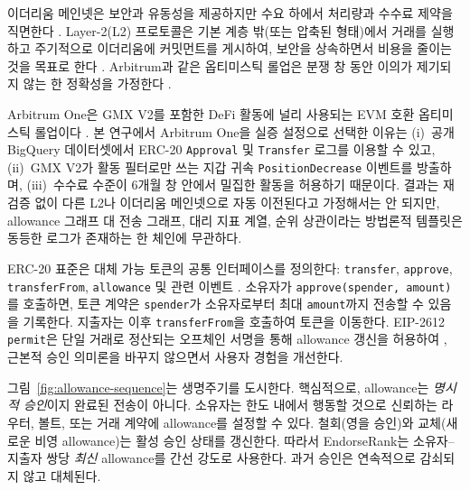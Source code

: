 
이더리움 메인넷은 보안과 유동성을 제공하지만 수요 하에서 처리량과 수수료 제약을 직면한다 . Layer-2(L2) 프로토콜은 기본 계층 밖(또는 압축된 형태)에서 거래를 실행하고 주기적으로 이더리움에 커밋먼트를 게시하여, 보안을 상속하면서 비용을 줄이는 것을 목표로 한다 . Arbitrum과 같은 옵티미스틱 롤업은 분쟁 창 동안 이의가 제기되지 않는 한 정확성을 가정한다 .

Arbitrum One은 GMX V2를 포함한 DeFi 활동에 널리 사용되는 EVM 호환 옵티미스틱 롤업이다 . 본 연구에서 Arbitrum One을 실증 설정으로 선택한 이유는 (i)~공개 BigQuery 데이터셋에서 ERC-20 \texttt{Approval} 및 \texttt{Transfer} 로그를 이용할 수 있고, (ii)~GMX V2가 활동 필터로만 쓰는 지갑 귀속 \texttt{PositionDecrease} 이벤트를 방출하며, (iii)~수수료 수준이 6개월 창 안에서 밀집한 활동을 허용하기 때문이다. 결과는 재검증 없이 다른 L2나 이더리움 메인넷으로 자동 이전된다고 가정해서는 안 되지만, allowance 그래프 대 전송 그래프, 대리 지표 계열, 순위 상관이라는 방법론적 템플릿은 동등한 로그가 존재하는 한 체인에 무관하다.


ERC-20 표준은 대체 가능 토큰의 공통 인터페이스를 정의한다: \texttt{transfer}, \texttt{approve}, \texttt{transferFrom}, \texttt{allowance} 및 관련 이벤트 . 소유자가 \texttt{approve(spender, amount)}를 호출하면, 토큰 계약은 \texttt{spender}가 소유자로부터 최대 \texttt{amount}까지 전송할 수 있음을 기록한다. 지출자는 이후 \texttt{transferFrom}을 호출하여 토큰을 이동한다. EIP-2612 \texttt{permit}은 단일 거래로 정산되는 오프체인 서명을 통해 allowance 갱신을 허용하여 , 근본적 승인 의미론을 바꾸지 않으면서 사용자 경험을 개선한다.

그림~\ref{fig:allowance-sequence}는 생명주기를 도시한다. 핵심적으로, allowance는 \emph{명시적 승인}이지 완료된 전송이 아니다. 소유자는 한도 내에서 행동할 것으로 신뢰하는 라우터, 볼트, 또는 거래 계약에 allowance를 설정할 수 있다. 철회(영을 승인)와 교체(새로운 비영 allowance)는 활성 승인 상태를 갱신한다. 따라서 EndorseRank는 소유자--지출자 쌍당 \emph{최신} allowance를 간선 강도로 사용한다. 과거 승인은 연속적으로 감쇠되지 않고 대체된다.

